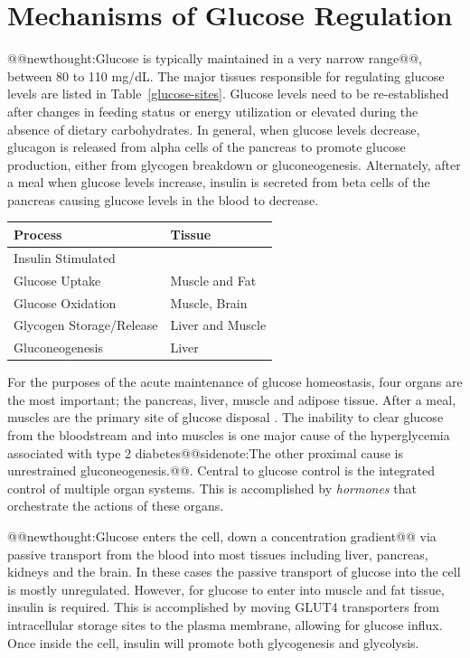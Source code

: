 \documentclass{tufte-handout}
\makeatletter
\def\newthought#1{@@newthought:#1@@}
\def\sidenote#1{@@sidenote:#1@@}
\makeatother
\begin{document}
\section{Mechanisms of Glucose Regulation}

\newthought{Glucose is typically maintained in a very narrow range}, between 80 to 110 mg/dL.  The major tissues responsible for regulating glucose levels are listed in Table~\ref{glucose-sites}. Glucose levels need to be re-established after changes in feeding status or energy utilization or elevated during the absence of dietary carbohydrates.  In general, when glucose levels decrease, glucagon is released from alpha cells of the pancreas to promote glucose production, either from glycogen breakdown or gluconeogenesis.  Alternately, after a meal when glucose levels increase, insulin is secreted from beta cells of the pancreas causing glucose levels in the blood to decrease.

\begin{margintable}
\caption{Primary sites for regulation of glucose homeostasis}\label{glucose-sites}
\begin{tabular}{@{}ll@{}}
\textbf{Process }                          & \textbf{Tissue}           \\ \midrule
Insulin Stimulated \\Glucose Uptake & Muscle and Fat   \\ \midrule
Glucose Oxidation & Muscle, Brain \\ \midrule
Glycogen Storage/Release                      & Liver and Muscle   \\ \midrule
Gluconeogenesis & Liver \\ \bottomrule
\end{tabular}
\end{margintable}

For the purposes of the acute maintenance of glucose homeostasis, four organs are the most important; the pancreas, liver, muscle and adipose tissue.  After a meal, muscles are the primary site of glucose disposal \citep{DeFronzo1981}.  The inability to clear glucose from the bloodstream and into muscles is one major cause of the hyperglycemia associated with type 2 diabetes\sidenote{The other proximal cause is unrestrained gluconeogenesis.}.  Central to glucose control is the integrated control of multiple organ systems.  This is accomplished by \emph{hormones} that orchestrate the actions of these organs. 

\newthought{Glucose enters the cell, down a concentration gradient} via passive transport from the blood into most tissues including liver, pancreas, kidneys and the brain.  In these cases the passive transport of glucose into the cell is mostly unregulated.  However, for glucose to enter into muscle and fat tissue, insulin is required.  This is accomplished by moving GLUT4 transporters from intracellular storage sites to the plasma membrane, allowing for glucose influx.  Once inside the cell, insulin will promote both glycogenesis and glycolysis.  
\end{document}
